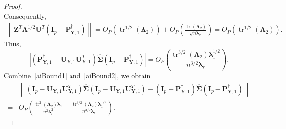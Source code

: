 \documentclass[12pt]{article} %
\DeclareMathOperator{\mytr}{tr}
\newcommand{\bZ}{\mathbf{Z}}
\newcommand{\bP}{\mathbf{P}}
\newcommand{\bY}{\mathbf{Y}}
\newcommand{\bI}{\mathbf{I}}
\newcommand{\bU}{\mathbf{U}}
\newcommand{\bfsym}[1]{\ensuremath{\boldsymbol{#1}}}
\def\blambda {\bfsym {\lambda}}
\def\bLambda {\bfsym {\Lambda}}
\def\bSigma {\bfsym {\Sigma}}
\theoremstyle{definition}
\begin{document}
\begin{appendices}
\begin{proof}
\begin{equation}
    \end{equation}
        Consequently,
    \begin{equation*}
        \begin{split}
        \left\|
        \bZ^T \bLambda^{1/2}\bU^T (\bI_p-\bP^\dagger_{\bY,1})  
        \right\|
         = 
         O_P\left(
             \mytr^{1/2}(\bLambda_2)
         \right)
         +O_P\left(
             \frac{\mytr(\bLambda_2)}{\sqrt{n\blambda_r}}
         \right)
         = 
         O_P\left(
             \mytr^{1/2}(\bLambda_2)
         \right).
        \end{split}
    \end{equation*}
    Thus,
    \begin{equation}\label{aiBound2}
    \left|(\bP^\dagger_{\bY,1}-\bU_{\bY,1}\bU_{\bY,1}^T)\hat{\bSigma}(\bI_p-\bP^\dagger_{\bY,1})\right|
             =O_P\left(
                 \frac{\mytr^{3/2}(\bLambda_2)\blambda_1^{1/2}}{n^{3/2}\blambda_r}
                \right).
    \end{equation}
    Combine~\eqref{aiBound1} and~\eqref{aiBound2}, we obtain
    \begin{equation*}
        \begin{split}
             &\left\|(\bI_p -\bU_{\bY,1}\bU_{\bY,1}^T)\hat{\bSigma}(\bI_p -\bU_{\bY,1}\bU_{\bY,1}^T)
             -
             (\bI_p-\bP^\dagger_{\bY,1})\hat{\bSigma}(\bI_p-\bP^\dagger_{\bY,1})\right\|
             \\
             =&
             O_P\left(
                    \frac{\mytr^2(\bLambda_2)\blambda_1}{n^2 \blambda_r^2}
                 +
                 \frac{\mytr^{3/2}(\bLambda_2)\blambda_1^{1/2}}{n^{3/2}\blambda_r}
                \right).
        \end{split}
    \end{equation*}


\end{proof}
\end{appendices}
\end{document}
